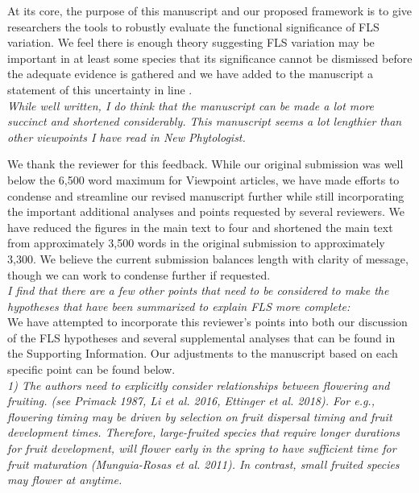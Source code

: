 \documentclass{article}[11pt]
\begin{document}
At its core, the purpose of this manuscript and our proposed framework is to give researchers the tools to robustly evaluate the functional significance of FLS variation. We feel there is enough theory suggesting FLS variation may be important in at least some species that its significance cannot be dismissed before the adequate evidence is gathered and we have added to the manuscript a statement of this uncertainty in line . \\

\emph{While well written, I do think that the manuscript can be made a lot more succinct and shortened considerably. This manuscript seems a lot lengthier than other viewpoints I have read in New Phytologist.}

\noindent We thank the reviewer for this feedback. While our original submission was well below the 6,500 word maximum for Viewpoint articles, we have made efforts to condense and streamline our revised manuscript further while still incorporating the important additional analyses and points requested by several reviewers. We have reduced the figures in the main text to four and shortened the main text from approximately 3,500 words in the original submission to approximately 3,300. We believe the current submission balances length with clarity of message, though we can work to condense further if requested.\\

\emph{I find that there are a few other points that need to be considered to make the hypotheses that have been summarized to explain FLS more complete:}\\

\noindent We have attempted to incorporate this reviewer's points into both our discussion of the FLS hypotheses and several supplemental analyses that can be found in the Supporting Information. Our adjustments to the manuscript based on each specific point can be found below.\\

\emph{1) The authors need to explicitly consider relationships between flowering and fruiting. (see Primack 1987, Li et al. 2016, Ettinger et al. 2018). For e.g., flowering timing may be driven by selection on fruit dispersal timing and fruit development times. Therefore, large-fruited species that require longer durations for fruit development, will flower early in the spring to have sufficient time for fruit maturation (Munguia-Rosas et al. 2011). In contrast, small fruited species may flower at anytime.}\\
\end{document}
